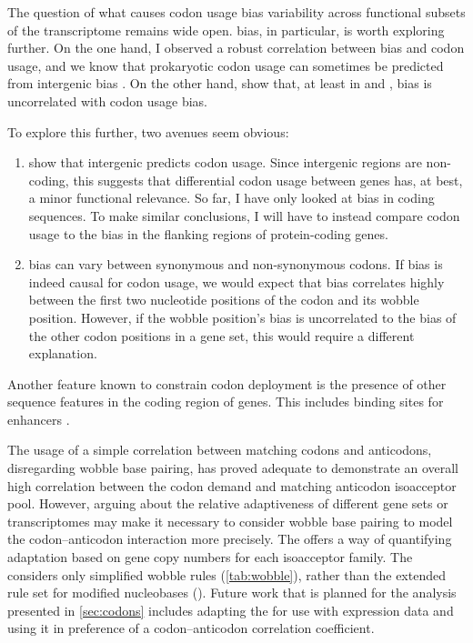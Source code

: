 The question of what causes codon usage bias variability across functional
subsets of the transcriptome remains wide open. \gc bias, in particular, is
worth exploring further. On the one hand, I observed a robust correlation
between \gc bias and codon usage, and we know that prokaryotic codon usage can
sometimes be predicted from intergenic \gc bias \citep{Chen:2004}. On the other
hand, \citet{Duret:2002} show that, at least in  and
, \gc bias is uncorrelated with codon usage bias.

To explore this further, two avenues seem obvious:

\begin{enumerate}
    \item \citet{Chen:2004} show that intergenic \gc predicts codon usage. Since
        intergenic regions are non-coding, this suggests that differential codon
        usage between genes has, at best, a minor functional relevance. So far,
        I have only looked at \gc bias in coding sequences. To make similar
        conclusions, I will have to instead compare codon usage to the \gc bias
        in the flanking regions of protein-coding genes.
    \item \gc bias can vary between synonymous and non-synonymous codons. If \gc
        bias is indeed causal for codon usage, we would expect that \gc bias
        correlates highly between the first two nucleotide positions of the
        codon and its wobble position. However, if the wobble position’s \gc
        bias is uncorrelated to the \gc bias of the other codon positions in a
        gene set, this would require a different explanation.
\end{enumerate}

Another feature known to constrain codon deployment is the presence of other
sequence features in the coding region of genes. This includes binding sites for
enhancers \citep{Blencowe:2000}.


The usage of a simple correlation between matching codons and anticodons,
disregarding wobble base pairing, has proved adequate to demonstrate an overall
high correlation between the codon demand and matching \trna anticodon
isoacceptor pool. However, arguing about the relative adaptiveness of different
gene sets or transcriptomes may make it  necessary to consider wobble base
pairing to model the codon--anticodon interaction more precisely. The \tai
\citep{Dos_Reis:2003} offers a way of quantifying \trna adaptation based on
\trna gene copy numbers for each isoacceptor family. The \tai considers only
simplified wobble rules (\cref{tab:wobble}), rather than the extended rule set
for modified nucleobases (\citep{Murphy:2004}). Future work that is planned for
the analysis presented in \cref{sec:codons} includes adapting the \tai for use
with \trna expression data and using it in preference of a codon--anticodon
correlation coefficient.
